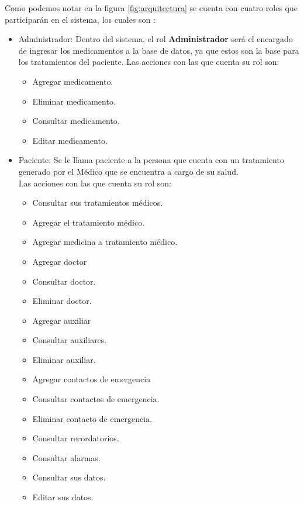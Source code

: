 Como podemos notar en la figura \ref{fig:arquitectura} se cuenta con cuatro roles que participarán en el sistema, los cuales son :
\begin{itemize}
	\item Administrador: Dentro del sistema, el rol \textbf{Administrador} será el encargado de ingresar los medicamentos a la base de datos, ya que estos son la base para los tratamientos del paciente.
	Las acciones con las que cuenta su rol son:
	\begin{itemize}
		\item Agregar medicamento.
		\item Eliminar medicamento.
		\item Consultar medicamento.
		\item Editar medicamento.
	\end{itemize}
	
	
	\item Paciente: Se le llama paciente a la persona que cuenta con un tratamiento generado por el Médico que se encuentra a cargo de su salud.\\
	
	Las acciones con las que cuenta su rol son:
	\begin{itemize}
		\item Consultar sus tratamientos médicos.
		\item Agregar el tratamiento médico.
		\item Agregar medicina a tratamiento médico.
		\item Agregar doctor
		\item Consultar doctor.
		\item Eliminar doctor.
		\item Agregar auxiliar
		\item Consultar auxiliares.
		\item Eliminar auxiliar.
		\item Agregar contactos de emergencia
		\item Consultar contactos de emergencia.
		\item Eliminar contacto de emergencia.
		\item Consultar recordatorios.
		\item Consultar alarmas.
		\item Consultar sus datos.
		\item Editar sus datos.
	\end{itemize}


\end{itemize}
